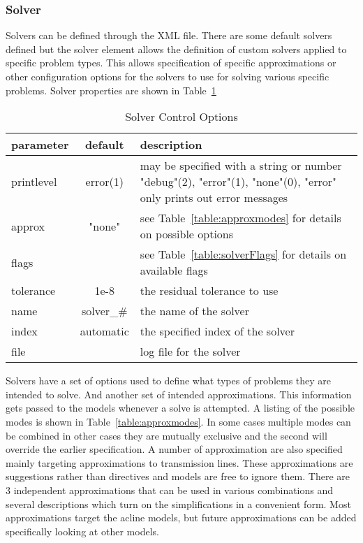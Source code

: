 \documentclass[12pt]{article} %
\begin{document}
 \subsubsection{Solver}
 Solvers can be defined through the XML file.  There are some default solvers defined but the solver element allows the definition of custom solvers applied to specific problem types.  This allows specification of specific approximations or other configuration options for the solvers to use for solving various specific problems.  Solver properties are shown in Table~\ref{table:solverOptions}

  \begin{table}[ht]

      \caption{Solver Control Options} %
      \centering %
      \begin{tabular}{l c p{8cm}} %
          \hline %
          parameter & default & description \\ [0.5ex] %
          \hline %
          printlevel & error(1) & may be specified with a string or number "debug"(2), "error"(1), "none"(0), "error" only prints out error messages \\ %
          approx & "none" & see Table~\ref{table:approxmodes} for details on possible options \\
          flags &  & see Table~\ref{table:solverFlags} for details on available flags \\
          tolerance & 1e-8 & the residual tolerance to use\\
          name & solver\_\# & the name of the solver \\
          index & automatic & the specified index of the solver \\
          file & & log file for the solver \\%
          \hline %
      \end{tabular}
      \label{table:solverOptions}
  \end{table}
  Solvers have a set of options used to define what types of problems they are intended to solve. And another set of intended approximations.  This information gets passed to the models whenever a solve is attempted.  A listing of the possible modes is shown in Table~\ref{table:approxmodes}.  In some cases multiple modes can be combined in other cases they are mutually exclusive and the second will override the earlier specification.  A number of approximation are also specified mainly targeting approximations to transmission lines.  These approximations are suggestions rather than directives and models are free to ignore them.  There are 3 independent approximations that can be used in various combinations and several descriptions which turn on the simplifications in a convenient form.  Most approximations target the acline models, but future approximations can be added specifically looking at other models.
\end{document}
